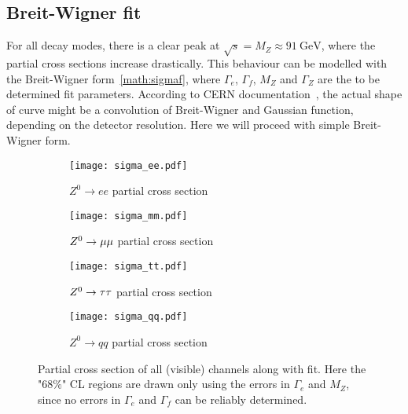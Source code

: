 \subsection{Breit-Wigner fit}
For all decay modes, there is a clear peak at $\sqrt{s} = M_Z \approx \SI{91}{\giga\eV}$, where the partial cross sections increase drastically. This behaviour can be modelled with the Breit-Wigner form~\ref{math:sigmaf}, where $\Gamma_e$, $\Gamma_f$, $M_Z$ and $\Gamma_Z$ are the to be determined fit parameters. According to CERN documentation~\cite{cms}, the actual shape of curve might be a convolution of Breit-Wigner and Gaussian function, depending on the detector resolution. Here we will proceed with simple Breit-Wigner form.
\begin{figure}[ht]
	\centering
	\begin{subfigure}[b]{0.5\textwidth}
	\begin{center}
	\texttt{[image: sigma\_ee.pdf]}%
	\end{center}
	\caption{$Z^0 \rightarrow ee$ partial cross section}
	\end{subfigure}%
	\begin{subfigure}[b]{0.5\textwidth}
	\begin{center}
	\texttt{[image: sigma\_mm.pdf]}
	\end{center}
	\caption{$Z^0 \rightarrow \mu\mu$ partial cross section}
	\end{subfigure}
	\begin{subfigure}[b]{0.5\textwidth}
	\begin{center}
	\texttt{[image: sigma\_tt.pdf]}%
	\end{center}
	\caption{$Z^0 \rightarrow \tau\tau$ partial cross section}
	\end{subfigure}%
	\begin{subfigure}[b]{0.5\textwidth}
	\begin{center}
	\texttt{[image: sigma\_qq.pdf]}
	\end{center}
	\caption{$Z^0 \rightarrow qq$ partial cross section}
	\end{subfigure}
	\caption{Partial cross section of all (visible) channels along with fit. Here the "$68\%$" CL regions are drawn only using the errors in $\Gamma_e$ and $M_Z$, since no errors in $\Gamma_e$ and $\Gamma_f$ can be reliably determined.}%
	\label{fig:p_cross_fit}
\end{figure}	

